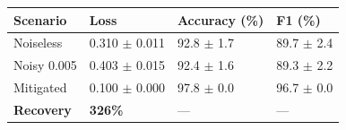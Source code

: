 \begin{tabular}{llll}
\toprule
Scenario & Loss & Accuracy (\%) & F1 (\%) \\
\midrule
Noiseless & 0.310 $\pm$ 0.011 & 92.8 $\pm$ 1.7 & 89.7 $\pm$ 2.4 \\
Noisy 0.005 & 0.403 $\pm$ 0.015 & 92.4 $\pm$ 1.6 & 89.3 $\pm$ 2.2 \\
Mitigated & 0.100 $\pm$ 0.000 & 97.8 $\pm$ 0.0 & 96.7 $\pm$ 0.0 \\
\textbf{Recovery} & \textbf{326\%} & --- & --- \\
\bottomrule
\end{tabular}
